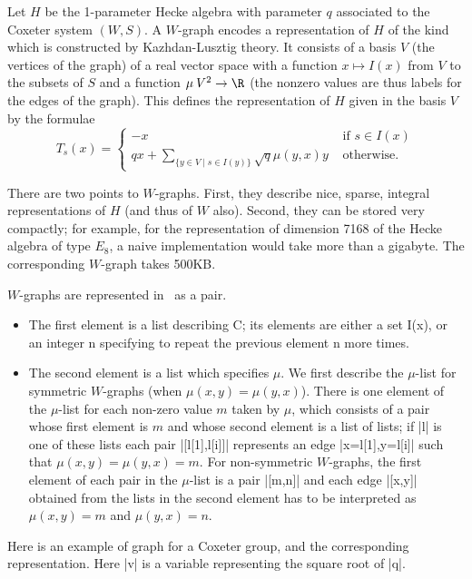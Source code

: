 
Let  $H$ be the 1-parameter Hecke  algebra with parameter $q$ associated to
the  Coxeter system $(W,S)$. A $W$-graph encodes a representation of $H$ of
the  kind which is constructed by  Kazhdan-Lusztig theory. It consists of a
basis  $V$  (the  vertices  of  the  graph)  of  a real vector space with a
function  $x\mapsto I(x)$  from $V$  to the  subsets of  $S$ and a function
$\mu\:  V^2\to\R$ (the nonzero values are thus  labels for the edges of the
graph).  This defines the representation  of $H$ given in  the basis $V$ by
the formulae
$$ T_s(x)=\left\{ \begin{array}{ll}
  -x&\text{ if $s\in I(x)$}\\
  q x+\sum_{\{y\in V\mid s\in I(y)\}} \sqrt q\mu(y,x)y&\text{ otherwise.}
\end{array}\right .$$

There  are two  points to  $W$-graphs. First,  they describe  nice, sparse,
integral representations of $H$ (and thus of $W$ also). Second, they can be
stored  very compactly;  for example,  for the  representation of dimension
7168  of the Hecke algebra of type $E_8$, a naive implementation would take
more than a gigabyte. The corresponding $W$-graph takes 500KB.

$W$-graphs are represented  in \CHEVIE\ as a  pair.
\begin{itemize}
\item
The  first element is a list describing C; its elements are either a set
I(x),  or an integer n  specifying to repeat the  previous element n more
times.
\item
The  second element is a list which  specifies $\mu$. We first describe the
$\mu$-list  for symmetric  $W$-graphs (when  $\mu(x,y)=\mu(y,x)$). There is
one  element of the $\mu$-list for each  non-zero value $m$ taken by $\mu$,
which  consists  of  a  pair  whose  first  element is $m$ and whose second
element  is  a  list  of  lists;  if  |l|  is  one of these lists each pair
|[l[1],l[i]]| represents an edge |x=l[1],y=l[i]| such that
$\mu(x,y)=\mu(y,x)=m$.  For non-symmetric $W$-graphs,  the first element of
each  pair  in  the  $\mu$-list  is  a  pair  |[m,n]| and each edge |[x,y]|
obtained  from the  lists in  the second  element has  to be interpreted as
$\mu(x,y)=m$ and $\mu(y,x)=n$.
\end{itemize}

Here  is an  example of  graph for  a Coxeter  group, and the corresponding
representation. Here |v| is a variable representing the square root of |q|.

